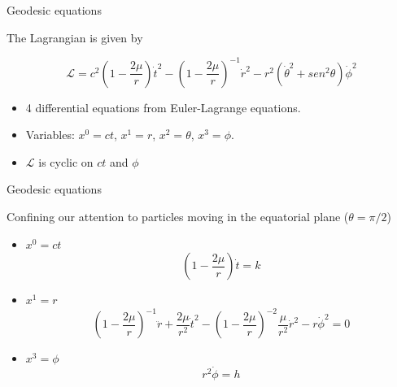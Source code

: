 \documentclass[xcolor=dvipsnames]{beamer}
\begin{document}
\begin{frame}{Geodesic equations}

The Lagrangian is given by 

\begin{block}{}
\begin{equation*}
\mathcal{L} = c^{2}\left( 1-\frac{2\mu}{r} \right)\dot{t}^{2}-\left( 1-\frac{2\mu}{r}\right)^{-1}\dot{r}^{2}-r^{2}\left(\dot{\theta}^{2}+sen^{2}\theta\right)\dot{\phi}^{2}
\end{equation*}
\end{block}

\begin{itemize}
    \item 4 differential equations from Euler-Lagrange equations.
    \item Variables: $x^0 = ct$, $x^1 = r$, $x^2 = \theta$, $x^3 = \phi$.
    \item $\mathcal{L}$ is cyclic on $ct$ and $\phi$
\end{itemize}

\end{frame}


\begin{frame}{Geodesic equations}
    
Confining our attention to particles moving in the equatorial plane ($\theta = \pi/2$)

\begin{itemize}
    \item $x^0 = ct$ 
    \begin{equation*}
        \left( 1 - \frac{2 \mu}{r} \right) \dot{t} = k 
    \end{equation*}
    
    \item $x^1 = r$ 
    \begin{equation*}
        \left( 1 - \frac{2 \mu}{r} \right)^{-1} \ddot{r} + \frac{2\mu}{r^2} \dot{t}^2 - \left( 1 - \frac{2 \mu}{r} \right)^{-2} \frac{\mu}{r^2} \dot{r}^2 - r\dot{\phi}^2  = 0 
    \end{equation*}
    
    \item $x^3 = \phi$ 
    \begin{equation*}
        r^2 \dot{\phi} = h
    \end{equation*}
\end{itemize}

\end{frame}
\end{document}

